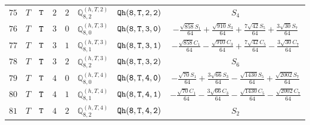 \documentclass[fleqn,8pt]{jsarticle}
\begin{document}
\begin{table}[ht!]
\begin{center}
\begin{tabular}{cccccccc}
$ 75 $ & $ T $ & $ {\tt T} $ & $ 2 $ & $ 2 $ & $ \mathbb{Q}_{8,2}^{(h,T,2)} $ & $ {\tt Qh(8,T,2,2)} $ & $ S_{4} $ \\
$ 76 $ & $ T $ & $ {\tt T} $ & $ 3 $ & $ 0 $ & $ \mathbb{Q}_{8,0}^{(h,T,3)} $ & $ {\tt Qh(8,T,3,0)} $ & $ - \frac{\sqrt{858} S_{1}}{64} + \frac{\sqrt{910} S_{3}}{64} + \frac{7 \sqrt{42} S_{5}}{64} + \frac{3 \sqrt{30} S_{7}}{64} $ \\
$ 77 $ & $ T $ & $ {\tt T} $ & $ 3 $ & $ 1 $ & $ \mathbb{Q}_{8,1}^{(h,T,3)} $ & $ {\tt Qh(8,T,3,1)} $ & $ - \frac{\sqrt{858} C_{1}}{64} - \frac{\sqrt{910} C_{3}}{64} + \frac{7 \sqrt{42} C_{5}}{64} - \frac{3 \sqrt{30} C_{7}}{64} $ \\
$ 78 $ & $ T $ & $ {\tt T} $ & $ 3 $ & $ 2 $ & $ \mathbb{Q}_{8,2}^{(h,T,3)} $ & $ {\tt Qh(8,T,3,2)} $ & $ S_{6} $ \\
$ 79 $ & $ T $ & $ {\tt T} $ & $ 4 $ & $ 0 $ & $ \mathbb{Q}_{8,0}^{(h,T,4)} $ & $ {\tt Qh(8,T,4,0)} $ & $ - \frac{\sqrt{70} S_{1}}{64} + \frac{3 \sqrt{66} S_{3}}{64} - \frac{\sqrt{1430} S_{5}}{64} + \frac{\sqrt{2002} S_{7}}{64} $ \\
$ 80 $ & $ T $ & $ {\tt T} $ & $ 4 $ & $ 1 $ & $ \mathbb{Q}_{8,1}^{(h,T,4)} $ & $ {\tt Qh(8,T,4,1)} $ & $ - \frac{\sqrt{70} C_{1}}{64} - \frac{3 \sqrt{66} C_{3}}{64} - \frac{\sqrt{1430} C_{5}}{64} - \frac{\sqrt{2002} C_{7}}{64} $ \\
$ 81 $ & $ T $ & $ {\tt T} $ & $ 4 $ & $ 2 $ & $ \mathbb{Q}_{8,2}^{(h,T,4)} $ & $ {\tt Qh(8,T,4,2)} $ & $ S_{2} $ \\
 \hline \hline
\end{tabular}
\end{center}
\end{table}
\end{document}
